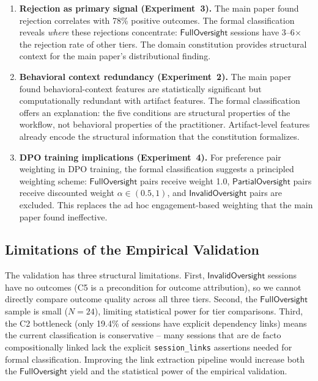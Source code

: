 \documentclass[11pt]{article}
\begin{document}
\begin{enumerate}[nosep]

\item \textbf{Rejection as primary signal (Experiment~3).}
The main paper found rejection correlates with 78\% positive outcomes.
The formal classification reveals \emph{where} these rejections concentrate: $\mathsf{FullOversight}$ sessions have 3--6$\times$ the rejection rate of other tiers.
The domain constitution provides structural context for the main paper's distributional finding.

\item \textbf{Behavioral context redundancy (Experiment~2).}
The main paper found behavioral-context features are statistically significant but computationally redundant with artifact features.
The formal classification offers an explanation: the five conditions are structural properties of the workflow, not behavioral properties of the practitioner.
Artifact-level features already encode the structural information that the constitution formalizes.

\item \textbf{DPO training implications (Experiment~4).}
For preference pair weighting in DPO training, the formal classification suggests a principled weighting scheme: $\mathsf{FullOversight}$ pairs receive weight 1.0, $\mathsf{PartialOversight}$ pairs receive discounted weight $\alpha \in (0.5, 1)$, and $\mathsf{InvalidOversight}$ pairs are excluded.
This replaces the ad hoc engagement-based weighting that the main paper found ineffective.

\end{enumerate}

\subsection{Limitations of the Empirical Validation}
\label{sec:empirical-limitations}

The validation has three structural limitations.
First, $\mathsf{InvalidOversight}$ sessions have no outcomes (C5 is a precondition for outcome attribution), so we cannot directly compare outcome quality across all three tiers.
Second, the $\mathsf{FullOversight}$ sample is small ($N = 24$), limiting statistical power for tier comparisons.
Third, the C2 bottleneck (only 19.4\% of sessions have explicit dependency links) means the current classification is conservative -- many sessions that are de facto compositionally linked lack the explicit \texttt{session\_links} assertions needed for formal classification.
Improving the link extraction pipeline would increase both the $\mathsf{FullOversight}$ yield and the statistical power of the empirical validation.
\end{document}
